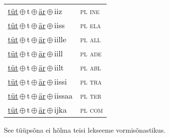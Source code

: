 \begin{minipage}{\textwidth}
\begin{sideways}
\begin{tabular}{l l}
\underline{tüt}\,$\oplus$\,t\,$\oplus$\,\underline{är}\,$\oplus$\,iiz & \textsc{ pl ine } \\
\underline{tüt}\,$\oplus$\,t\,$\oplus$\,\underline{är}\,$\oplus$\,iiss & \textsc{ pl ela } \\
\underline{tüt}\,$\oplus$\,t\,$\oplus$\,\underline{är}\,$\oplus$\,iille & \textsc{ pl all } \\
\underline{tüt}\,$\oplus$\,t\,$\oplus$\,\underline{är}\,$\oplus$\,iill & \textsc{ pl ade } \\
\underline{tüt}\,$\oplus$\,t\,$\oplus$\,\underline{är}\,$\oplus$\,iilt & \textsc{ pl abl } \\
\underline{tüt}\,$\oplus$\,t\,$\oplus$\,\underline{är}\,$\oplus$\,iissi & \textsc{ pl tra } \\
\underline{tüt}\,$\oplus$\,t\,$\oplus$\,\underline{är}\,$\oplus$\,iissaa & \textsc{ pl ter } \\
\underline{tüt}\,$\oplus$\,t\,$\oplus$\,\underline{är}\,$\oplus$\,ijka & \textsc{ pl com } \\
\end{tabular}
\end{sideways}
\label{tab:tüüpsõnamall-tütär}

\end{minipage}

 
\vspace{1em}
\noindent See tüüpsõna ei hõlma teisi lekseeme vormi\-sõnastikus.
